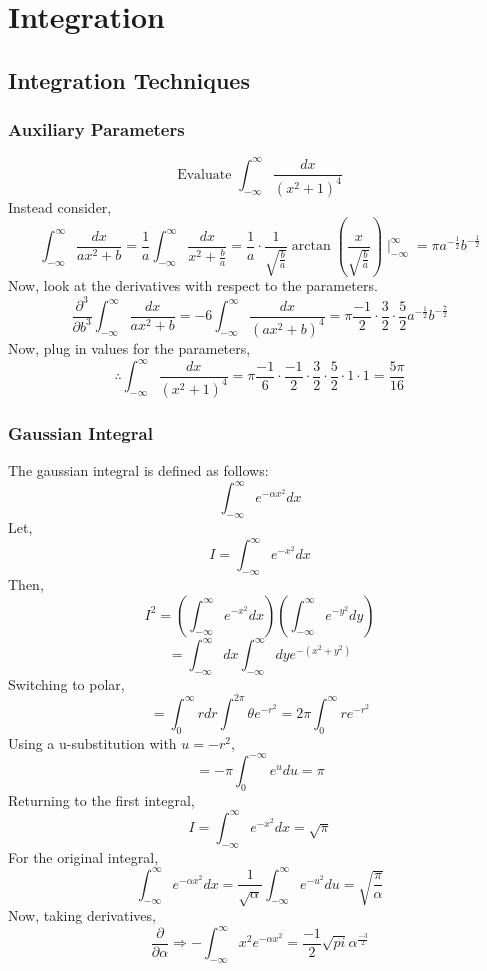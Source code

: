 \documentclass[../main.tex]{subfiles}
\begin{document}
\chapter{Integration}
\section{Integration Techniques}
    \subsection{Auxiliary Parameters}
        $$\text{Evaluate } \int_{-\infty}^{\infty}\frac{dx}{(x^{2}+1)^{4}}$$
        Instead consider, 
        $$\int_{-\infty}^{\infty}\frac{dx}{ax^{2}+b}=\frac{1}{a}\int_{-\infty}^{\infty}\frac{dx}{x^{2}+\frac{b}{a}}=\frac{1}{a}\cdot\frac{1}{\sqrt{\frac{b}{a}}}\arctan(\frac{x}{\sqrt{\frac{b}{a}}})\mid_{-\infty}^{\infty}=\pi a^{-\frac{1}{2}}b^{-\frac{1}{2}}$$
        Now, look at the derivatives with respect to the parameters.
        $$\frac{\partial^{3}}{\partial b^{3}}\int_{-\infty}^{\infty}\frac{dx}{ax^{2}+b}=-6\int_{-\infty}^{\infty}\frac{dx}{(ax^{2}+b)^{4}}=\pi\frac{-1}{2}\cdot\frac{3}{2}\cdot\frac{5}{2}a^{-\frac{1}{2}}b^{-\frac{7}{2}}$$
        Now, plug in values for the parameters,
        $$\therefore \int_{-\infty}^{\infty}\frac{dx}{(x^{2}+1)^{4}}=\pi\frac{-1}{6}\cdot\frac{-1}{2}\cdot\frac{3}{2}\cdot\frac{5}{2}\cdot 1\cdot 1=\frac{5\pi}{16}$$

    \subsection{Gaussian Integral}
        The gaussian integral is defined as follows:
        $$\int_{-\infty}^{\infty}e^{-\alpha x^{2}}dx$$
        Let, $$I=\int_{-\infty}^{\infty}e^{-x^{2}}dx$$
        Then, $$I^{2}=\left(\int_{-\infty}^{\infty}e^{-x^{2}}dx\right)\left(\int_{-\infty}^{\infty}e^{-y^{2}}dy\right)$$
        $$=\int_{-\infty}^{\infty}dx\int_{-\infty}^{\infty}dy e^{-(x^{2}+y^{2})}$$
        Switching to polar,
        $$=\int_{0}^{\infty}rdr\int_{}^{2\pi}\theta e^{-r^{2}}=2\pi\int_{0}^{\infty}re^{-r^{2}}$$
        Using a u-substitution with $u=-r^{2}$,
        $$=-\pi \int_{0}^{-\infty}e^{u}du=\pi$$
        Returning to the first integral,
        $$I=\int_{-\infty}^{\infty}e^{-x^{2}}dx=\sqrt{\pi}$$
        For the original integral,
        $$\int_{-\infty}^{\infty}e^{-\alpha x^{2}}dx=\frac{1}{\sqrt{\alpha}}\int_{-\infty}^{\infty}e^{-u^{2}}du=\sqrt{\frac{\pi}{\alpha}}$$
        Now, taking derivatives,
        $$\frac{\partial}{\partial \alpha}\Rightarrow -\int_{-\infty}^{\infty}x^{2}e^{-\alpha x^{2}}=\frac{-1}{2}\sqrt{pi}\alpha^{\frac{-3}{2}}$$
\end{document}
